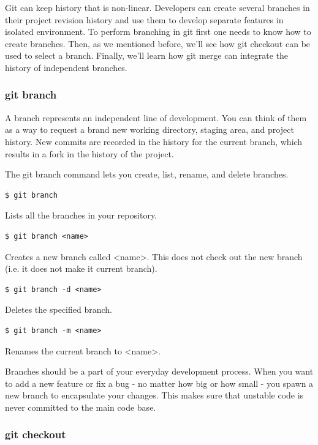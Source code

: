 \documentclass{article}
\begin{document}
Git can keep history that is non-linear. Developers can create several
branches in their project revision history and use them to develop
separate features in isolated environment. 
To perform branching in git first one needs to know how to create branches. 
Then, as we mentioned before, we'll see how git checkout can be used to
select a branch. Finally, we'll learn how git merge can integrate the
history of independent branches.

\subsubsection*{git branch}

A branch represents an independent line of development.
 You can think of them as a
way to request a brand new working directory, staging area, and
project history. New commits are recorded in the history for the
current branch, which results in a fork in the history of the
project.

The git branch command lets you create, list, rename, and delete
branches.

\begin{lstlisting}
$ git branch
\end{lstlisting}

Lists all the branches in your repository.

\begin{lstlisting}
$ git branch <name>
\end{lstlisting}

Creates a new branch called <name>. This does not check out the new
branch (i.e. it does not make it current branch).

\begin{lstlisting}
$ git branch -d <name>
\end{lstlisting}

Deletes the specified branch.

\begin{lstlisting}
$ git branch -m <name>
\end{lstlisting}

Renames the current branch to <name>.

 Branches should be a part of your everyday development
 process. When you want to add a new feature or fix a bug - no matter
 how big or how small - you spawn a new branch to encapsulate your
 changes. This makes sure that unstable code is never committed to the
 main code base.

\subsubsection*{git checkout}
\end{document}
